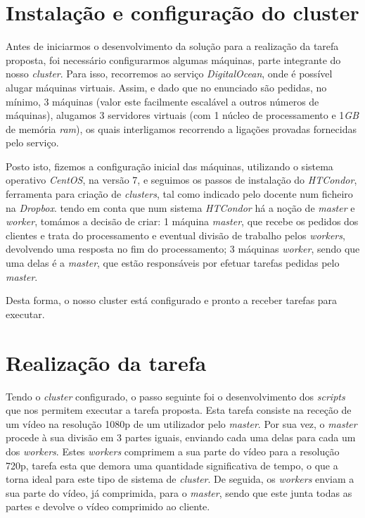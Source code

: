 \documentclass[a4paper]{report}
\begin{document}
    \section{Instalação e configuração do cluster}
	Antes de iniciarmos o desenvolvimento da solução para a realização da tarefa proposta, foi necessário configurarmos algumas máquinas, parte integrante do nosso \textit{cluster}. Para isso, recorremos ao serviço \textit{DigitalOcean}, onde é possível alugar máquinas virtuais. Assim, e dado que no enunciado são pedidas, no mínimo, 3 máquinas (valor este facilmente escalável a outros números de máquinas), alugamos 3 servidores virtuais (com 1 núcleo de processamento e 1\textit{GB} de memória \textit{ram}), os quais interligamos recorrendo a ligações provadas fornecidas pelo serviço.
	
	Posto isto, fizemos a configuração inicial das máquinas, utilizando o sistema operativo \textit{CentOS}, na versão 7, e seguimos os passos de instalação do \textit{HTCondor}, ferramenta para criação de \textit{clusters}, tal como indicado pelo docente num ficheiro na \textit{Dropbox}.
	tendo em conta que num sistema \textit{HTCondor} há a noção de \textit{master} e \textit{worker}, tomámos a decisão de criar: 1 máquina \textit{master}, que recebe os pedidos dos clientes e trata do processamento e eventual divisão de trabalho pelos \textit{workers}, devolvendo uma resposta no fim do processamento; 3 máquinas \textit{worker}, sendo que uma delas é a \textit{master}, que estão responsáveis por efetuar tarefas pedidas pelo \textit{master}.
	
	Desta forma, o nosso cluster está configurado e pronto a receber tarefas para executar.
    
    \section{Realização da tarefa}
    Tendo o \textit{cluster} configurado, o passo seguinte foi o desenvolvimento dos \textit{scripts} que nos permitem executar a tarefa proposta. Esta tarefa consiste na receção de um vídeo na resolução 1080p de um utilizador pelo \textit{master}. Por sua vez, o \textit{master} procede à sua divisão em 3 partes iguais, enviando cada uma delas para cada um dos \textit{workers}. Estes \textit{workers} comprimem a sua parte do vídeo para a resolução 720p, tarefa esta que demora uma quantidade significativa de tempo, o que a torna ideal para este tipo de sistema de \textit{cluster}. De seguida, os \textit{workers} enviam a sua parte do vídeo, já comprimida, para o \textit{master}, sendo que este junta todas as partes e devolve o vídeo comprimido ao cliente.
    
\end{document}

